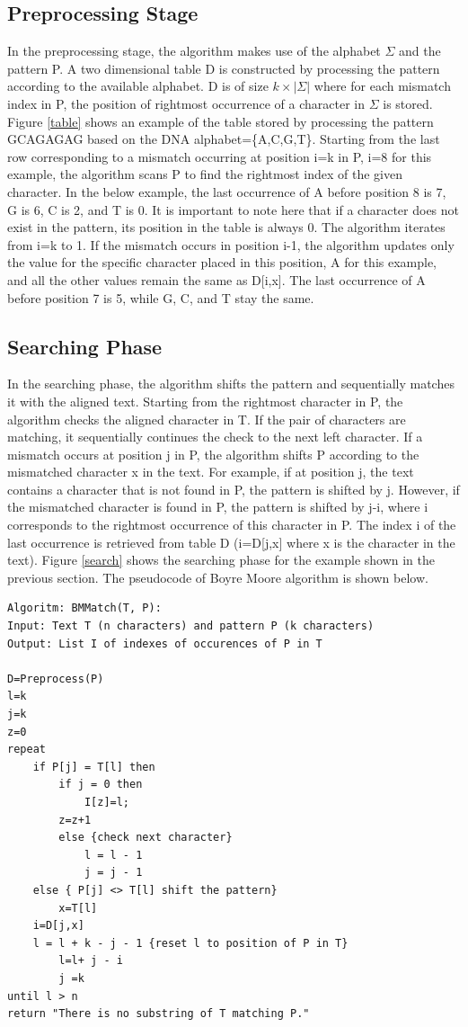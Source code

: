 \documentclass[paper=a4, fontsize=11pt]{scrartcl} %
\numberwithin{equation}{section} %
\numberwithin{figure}{section} %
\numberwithin{table}{section} %
\begin{document}
\subsection{Preprocessing Stage}
In the preprocessing stage, the algorithm makes use of the alphabet $\Sigma$ and the pattern P. A two dimensional table D is constructed by processing the pattern according to the available alphabet. D is of size $k\times|\Sigma|$ where for each mismatch index in P, the position of rightmost occurrence of a character in $\Sigma$ is stored. Figure \ref{table} shows an example of the table stored by processing the pattern GCAGAGAG based on the DNA alphabet=\{A,C,G,T\}. Starting from the last row corresponding to a mismatch occurring at position i=k in P, i=8 for this example, the algorithm scans P to find the rightmost index of the given character. In the below example, the last occurrence of A before position 8 is 7, G is 6, C is 2, and T is 0. It is important to note here that if a character does not exist in the pattern, its position in the table is always 0. The algorithm iterates from i=k to 1. If the mismatch occurs in position i-1, the algorithm updates only the value for the specific character placed in this position, A for this example, and all the other values remain the same as D[i,x]. The last occurrence of A before position 7 is 5, while G, C, and T stay the same.


\subsection{Searching Phase}

In the searching phase, the algorithm shifts the pattern and sequentially matches it with the aligned text. Starting from the rightmost character in P, the algorithm checks the aligned character in T. If the pair of characters are matching, it sequentially continues the check to the next left character. If a mismatch occurs at position j in P, the algorithm shifts P according to the mismatched character x in the text. For example, if at position j, the text contains a character that is not found in P, the pattern is shifted by j. However, if the mismatched character is found in P, the pattern is shifted by j-i, where i corresponds to the rightmost occurrence of this character in P. The index i of the last occurrence is retrieved from table D (i=D[j,x] where x is the character in the text). Figure \ref{search} shows the searching phase for the example shown in the previous section. The pseudocode of Boyre Moore algorithm is shown below.\\
\begin{lstlisting}
Algoritm: BMMatch(T, P):
Input: Text T (n characters) and pattern P (k characters)
Output: List I of indexes of occurences of P in T

D=Preprocess(P)
l=k
j=k
z=0
repeat
    if P[j] = T[l] then
        if j = 0 then
            I[z]=l;
	    z=z+1
        else {check next character}
            l = l - 1
            j = j - 1
    else { P[j] <> T[l] shift the pattern}
        x=T[l]
	i=D[j,x]
	l = l + k - j - 1 {reset l to position of P in T}
        l=l+ j - i
        j =k
until l > n
return "There is no substring of T matching P."
\end{lstlisting}
\end{document}
